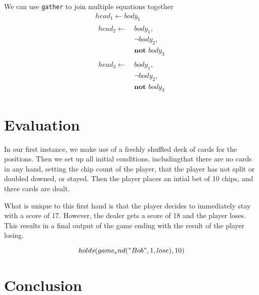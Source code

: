 \documentclass{article}
\begin{document}
We can use \texttt{gather} to join multiple equations together
\begin{gather}
    \label{eq:rule_3}
    head_1 \leftarrow body_1 \\
    \begin{split}
        \label{eq:rule_4}
        head_2 \leftarrow \
            & body_1, \\
            & \neg body_2, \\
            & \textbf{not } body_3
    \end{split} \\
    \begin{split}
        \label{eq:rule_5}
        head_3 \leftarrow \
            & body_1, \\
            & \neg body_2, \\
            & \textbf{not } body_3
    \end{split}
\end{gather}

\section{Evaluation}

In our first instance, we make use of a freshly shuffled deck of cards for the positions.
Then we set up all initial conditions, includingthat there are no cards in any hand,
setting the chip count of the player, that the player has not split or doubled downed, or stayed.
Then the player places an intial bet of 10 chips, and three cards are dealt.

What is unique to this first hand is that the player decides to immediately stay with a score of 17.
However, the dealer gets a score of 18 and the player loses.
This results in a final output of the game ending with the result of the player losing.

\begin{equation}
    holds(game_end("Bob",1,lose),10)
\end{equation}



\section{Conclusion}

\newpage


\end{document}
